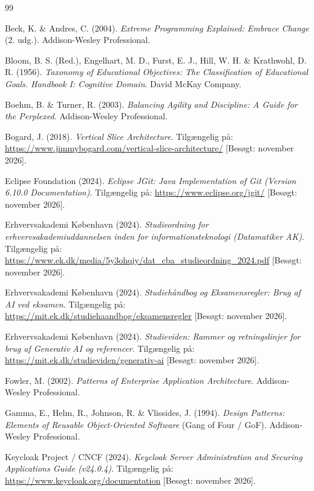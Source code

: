\documentclass[11pt,a4paper]{article}
\begin{document}
\begin{thebibliography}{99}

Beck, K. \& Andres, C. (2004). \textit{Extreme Programming Explained: Embrace Change} (2. udg.). Addison-Wesley Professional.

Bloom, B. S. (Red.), Engelhart, M. D., Furst, E. J., Hill, W. H. \& Krathwohl, D. R. (1956). \textit{Taxonomy of Educational Objectives: The Classification of Educational Goals. Handbook I: Cognitive Domain}. David McKay Company.

Boehm, B. \& Turner, R. (2003). \textit{Balancing Agility and Discipline: A Guide for the Perplexed}. Addison-Wesley Professional.

Bogard, J. (2018). \textit{Vertical Slice Architecture}. Tilgængelig på: \url{https://www.jimmybogard.com/vertical-slice-architecture/} [Besøgt: november 2026].

Eclipse Foundation (2024). \textit{Eclipse JGit: Java Implementation of Git (Version 6.10.0 Documentation)}. Tilgængelig på: \url{https://www.eclipse.org/jgit/} [Besøgt: november 2026].

Erhvervsakademi København (2024). \textit{Studieordning for erhvervsakademiuddannelsen inden for informationsteknologi (Datamatiker AK)}. Tilgængelig på: \url{https://www.ek.dk/media/5y3ohqiy/dat_cba_studieordning_2024.pdf} [Besøgt: november 2026].

Erhvervsakademi København (2024). \textit{Studiehåndbog og Eksamensregler: Brug af AI ved eksamen}. Tilgængelig på: \url{https://mit.ek.dk/studiehaandbog/eksamensregler} [Besøgt: november 2026].

Erhvervsakademi København (2024). \textit{Studieviden: Rammer og retningslinjer for brug af Generativ AI og referencer}. Tilgængelig på: \url{https://mit.ek.dk/studieviden/generativ-ai} [Besøgt: november 2026].

Fowler, M. (2002). \textit{Patterns of Enterprise Application Architecture}. Addison-Wesley Professional.

Gamma, E., Helm, R., Johnson, R. \& Vlissides, J. (1994). \textit{Design Patterns: Elements of Reusable Object-Oriented Software} (Gang of Four / GoF). Addison-Wesley Professional.

Keycloak Project / CNCF (2024). \textit{Keycloak Server Administration and Securing Applications Guide (v24.0.4)}. Tilgængelig på: \url{https://www.keycloak.org/documentation} [Besøgt: november 2026].


\end{thebibliography}
\end{document}

